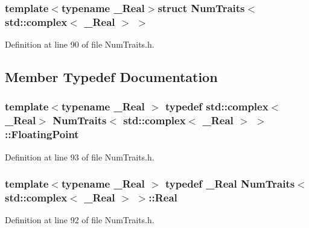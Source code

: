 \subsubsection*{template$<$typename \-\_\-\-Real$>$struct Num\-Traits$<$ std\-::complex$<$ \-\_\-\-Real $>$ $>$}



Definition at line 90 of file Num\-Traits.\-h.



\subsection{Member Typedef Documentation}
\hypertarget{struct_num_traits_3_01std_1_1complex_3_01___real_01_4_01_4_a57d3835addbd57cbaaf1ad0872595dec}{
\subsubsection[{Floating\-Point}]{\setlength{\rightskip}{0pt plus 5cm}template$<$typename \-\_\-\-Real $>$ typedef std\-::complex$<$\-\_\-\-Real$>$ {\bf Num\-Traits}$<$ std\-::complex$<$ \-\_\-\-Real $>$ $>$\-::{\bf Floating\-Point}}}\label{struct_num_traits_3_01std_1_1complex_3_01___real_01_4_01_4_a57d3835addbd57cbaaf1ad0872595dec}


Definition at line 93 of file Num\-Traits.\-h.

\hypertarget{struct_num_traits_3_01std_1_1complex_3_01___real_01_4_01_4_a8613be7f43ebabd44fe024bdc30457a1}{
\subsubsection[{Real}]{\setlength{\rightskip}{0pt plus 5cm}template$<$typename \-\_\-\-Real $>$ typedef \-\_\-\-Real {\bf Num\-Traits}$<$ std\-::complex$<$ \-\_\-\-Real $>$ $>$\-::{\bf Real}}}\label{struct_num_traits_3_01std_1_1complex_3_01___real_01_4_01_4_a8613be7f43ebabd44fe024bdc30457a1}


Definition at line 92 of file Num\-Traits.\-h.



